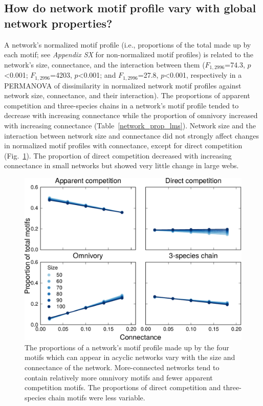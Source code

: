 \documentclass[12pt]{article}
\begin{document}
\begin{spacing}{2.0}
    \subsection*{How do network motif profile vary with global network properties?}

        A network's normalized motif profile (i.e., proportions of the total made up by each motif; see \emph{Appendix SX} for non-normalized motif profiles) is related to the network's size, connectance, and the interaction between them ($F_{1,2996}$=74.3, $p$\textless0.001; $F_{1,2996}$=4203, $p$\textless0.001; and $F_{1,2996}$=27.8, $p$\textless0.001, respectively in a PERMANOVA of dissimilarity in normalized network motif profiles against network size, connectance, and their interaction).
        The proportions of apparent competition and three-species chains in a network's motif profile tended to decrease with increasing connectance while the proportion of omnivory increased with increasing connectance (Table~\ref{network_prop_lms}). 
        Network size and the interaction between network size and connectance did not strongly affect changes in normalized motif profiles with connectance, except for direct competition (Fig.~\ref{motif_proportion_lms}). The proportion of direct competition decreased with increasing connectance in small networks but showed very little change in large webs.


        \begin{figure}[h!]
            \centering
            \includegraphics[width=.75\textwidth]{manuscript/figures/motif_proportion_lms.pdf}
            \caption{The proportions of a network's motif profile made up by the four motifs which can appear in acyclic networks vary with the size and connectance of the network. More-connected networks tend to contain relatively more omnivory motifs and fewer apparent competition motifs. The proportions of direct competition and three-species chain motifs were less variable.}
            \label{motif_proportion_lms}
        \end{figure}



\end{spacing}
\end{document}
